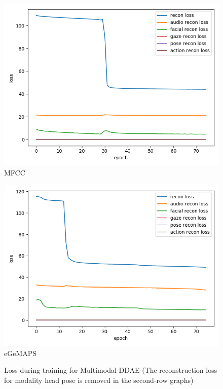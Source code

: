 \begin{figure}
\begin{minipage}[c]{0.48\linewidth}
    \includegraphics[width=\textwidth]{images/results/multimodal_aligned_mfcc_hidden040_batch1024_epoch100_noise01.png} \\
    MFCC
    \end{minipage}
    \begin{minipage}[c]{0.48\linewidth}
    \centering
    \includegraphics[width=\textwidth]{images/results/multimodal_aligned_egemaps_hidden050_batch1024_epoch100_noise01.png} \\
    eGeMAPS
    \end{minipage}
    \caption{Loss during training for Multimodal DDAE (The reconstruction loss for modality head pose is removed in the second-row graphs)}
    \label{fig:loss_multimodal}
\end{figure}

